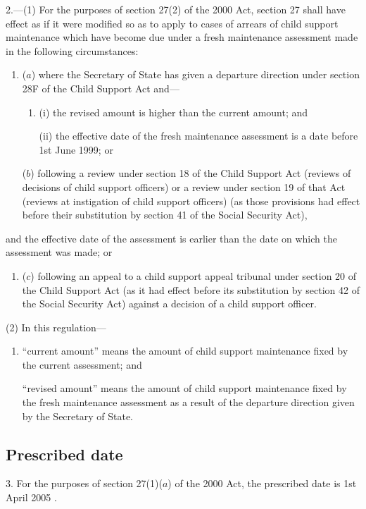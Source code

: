 \documentclass[12pt,a4paper]{article}
\begin{document}
2.---(1)  For the purposes of section 27(2) of the 2000 Act, section 27 shall have effect as if it were modified so as to apply to cases of arrears of child support maintenance which have become due under a fresh maintenance assessment made in the following circumstances:
\begin{enumerate}\item[]
($a$) where the Secretary of State has given a departure direction under section 28F of the Child Support Act and—
\begin{enumerate}\item[]
(i) the revised amount is higher than the current amount; and

(ii) the effective date of the fresh maintenance assessment is a date before 1st June 1999; or
\end{enumerate}

($b$) following a review under section 18 of the Child Support Act (reviews of decisions of child support officers) or a review under section 19 of that Act (reviews at instigation of child support officers) (as those provisions had effect before their substitution by section 41 of the Social Security Act),
\end{enumerate}
and the effective date of the assessment is earlier than the date on which the assessment was made; or
\begin{enumerate}\item[]
($c$) following an appeal to a child support appeal tribunal under section 20 of the Child Support Act (as it had effect before its substitution by section 42 of the Social Security Act) against a decision of a child support officer.
\end{enumerate}

(2) In this regulation—
\begin{enumerate}\item[]
“current amount” means the amount of child support maintenance fixed by the current assessment; and

“revised amount” means the amount of child support maintenance fixed by the fresh maintenance assessment as a result of the departure direction given by the Secretary of State.
\end{enumerate}

\subsection[3. Prescribed date]{Prescribed date}

3.  For the purposes of section 27(1)($a$)  of the 2000 Act, the prescribed date is 1st April 
2005%
.
\end{document}
